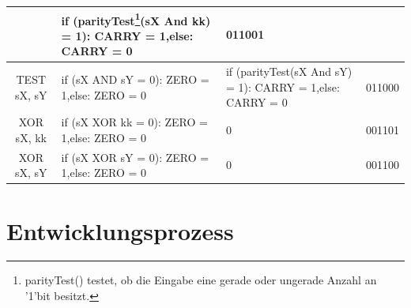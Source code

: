 \documentclass[bibliography=totoc,listof=totoc,index=totoc]{scrartcl}
\begin{document}
\begin{small}
\begin{longtable}{||c|p{6cm}|p{6cm}|c||}
    & if (parityTest\footnote{parityTest() testet, ob die Eingabe eine gerade oder ungerade Anzahl an '1'bit besitzt.}(sX And kk) = 1): CARRY = 1,\newline else: CARRY = 0 & 011001 \\ \hline
    TEST sX, sY  & if (sX AND sY = 0): ZERO = 1,\newline else: ZERO = 0
    & if (parityTest\footnotemark[1](sX And sY) = 1): CARRY = 1,\newline else: CARRY = 0 & 011000 \\ \hline
    XOR sX, kk & if (sX XOR kk = 0): ZERO = 1,\newline else: ZERO = 0 & 0 & 001101 \\ \hline
    XOR sX, sY & if (sX XOR sY = 0): ZERO = 1,\newline else: ZERO = 0 & 0 & 001100 \\ \hline
\end{longtable}
\label{tab:1}

\end{small}
\newpage
\section{Entwicklungsprozess}\label{sec:Entwicklungsprozess}%
\end{document}
